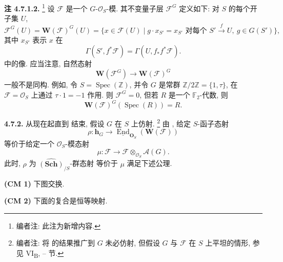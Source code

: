 \medskip
\noindent{}\textbf{注 4.7.1.2.}
\footnote{编者注: 此注为新增内容.}
设 \(\mathscr F\) 是一个 \(G\)-\(\mathcal O_S\)-模.
其不变量子层 \(\mathscr F^G\) 定义如下: 对 \(S\) 的每个开子集
\(U\),
\[
  \mathscr F^G(U)=\mathbf W(\mathscr F)^G(U)
   =\bigl\{x\in\mathscr F(U)\mid
       g\cdot x_{S'}=x_{S'}
       \text{ 对每个 }S'\xrightarrow{f}U,
       \ g\in G(S')\bigr\},
\]
其中 \(x_{S'}\) 表示 \(x\) 在
\[
  \Gamma(S',f^*\mathscr F)=\Gamma(U,f_*f^*\mathscr F).
\]
中的像.
应当注意, 自然态射
\[
  \mathbf W(\mathscr F^G)\longrightarrow\mathbf W(\mathscr F)^G
\]
一般不是同构. 例如, 令 \(S=\operatorname{Spec}(\mathbb Z)\),
并令 \(G\) 是常群 \(\mathbb Z/2\mathbb Z=\{1,\tau\}\), 在
\(\mathscr F=\mathcal O_S\) 上通过 \(\tau\cdot1=-1\) 作用.
则 \(\mathscr F^G=0\), 但若 \(R\) 是一个 \(\mathbb F_2\)-代数, 则
\[
  \mathbf W(\mathscr F)^G(\operatorname{Spec}(R))=R.
\]

\medskip
\noindent{}\textbf{4.7.2.}
从现在起直到  结束,
假设 \(G\) 在 \(S\) 上仿射.
\footnote{编者注: 将 
的结果推广到 \(G\) 未必仿射, 但假设 \(G\) 与 \(\mathscr F\)
在 \(S\) 上平坦的情形, 参见 VI\textsubscript{B},
-- 节.}
由 , 给定 \(S\)-函子态射
\[
  \rho:\mathbf h_G\longrightarrow
    \underline{\operatorname{End}}_{\mathbf O_S}
      (\mathbf W(\mathscr F))
\]
等价于给定一个 \(\mathcal O_S\)-模态射
\[
  \mu:\mathscr F\longrightarrow
    \mathscr F\otimes_{\mathcal O_S}\mathscr A(G).
\]
此时, \(\rho\) 为 \(\widehat{(\mathbf{Sch})}_{/S}\)-群态射
等价于 \(\mu\) 满足下述公理.

\medskip
\noindent\textbf{(CM 1)} 下图交换.

\begin{figure}[H]
  \centering
  
  \label{fig:sga3-exp1-p029-cm1-coaction-square}
\end{figure}

\noindent\textbf{(CM 2)} 下面的复合是恒等映射.

\begin{figure}[H]
  \centering
  
  \label{fig:sga3-exp1-p029-cm2-counit-composite}
\end{figure}

